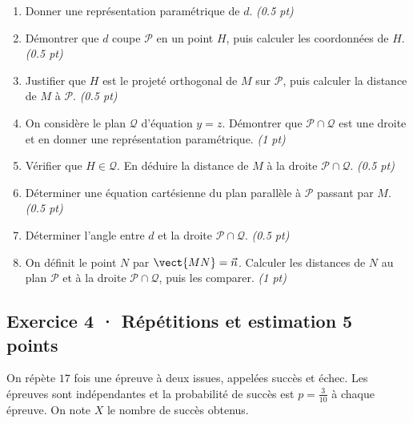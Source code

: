 \begin{enumerate}

\item Donner une représentation paramétrique de $d$. \hfill\textit{(\num{0,5} pt)}

\item Démontrer que $d$ coupe $\mathcal P$ en un point $H$, puis calculer les coordonnées de $H$. \hfill\textit{(\num{0,5} pt)}

\item Justifier que $H$ est le projeté orthogonal de $M$ sur $\mathcal P$, puis calculer la distance de $M$ à $\mathcal P$. \hfill\textit{(\num{0,5} pt)}

\item On considère le plan $\mathcal Q$ d'équation $y=z$. Démontrer que $\mathcal P\cap\mathcal Q$ est une droite et en donner une représentation paramétrique. \hfill\textit{(1 pt)}

\item Vérifier que $H\in\mathcal Q$. En déduire la distance de $M$ à la droite $\mathcal P\cap\mathcal Q$. \hfill\textit{(\num{0,5} pt)}

\item Déterminer une équation cartésienne du plan parallèle à $\mathcal P$ passant par $M$. \hfill\textit{(\num{0,5} pt)}

\item Déterminer l'angle entre $d$ et la droite $\mathcal P\cap\mathcal Q$. \hfill\textit{(\num{0,5} pt)}

\item On définit le point $N$ par $\vect{MN}=\vec n$. Calculer les distances de $N$ au plan $\mathcal P$ et à la droite $\mathcal P\cap\mathcal Q$, puis les comparer. \hfill\textit{(1 pt)}

\end{enumerate}

\subsection*{Exercice 4 · Répétitions et estimation \hfill 5 points}On répète $17$ fois une épreuve à deux issues, appelées succès et échec. Les épreuves sont indépendantes et la probabilité de succès est $p=\frac{3}{10}$ à chaque épreuve. On note $X$ le nombre de succès obtenus.

